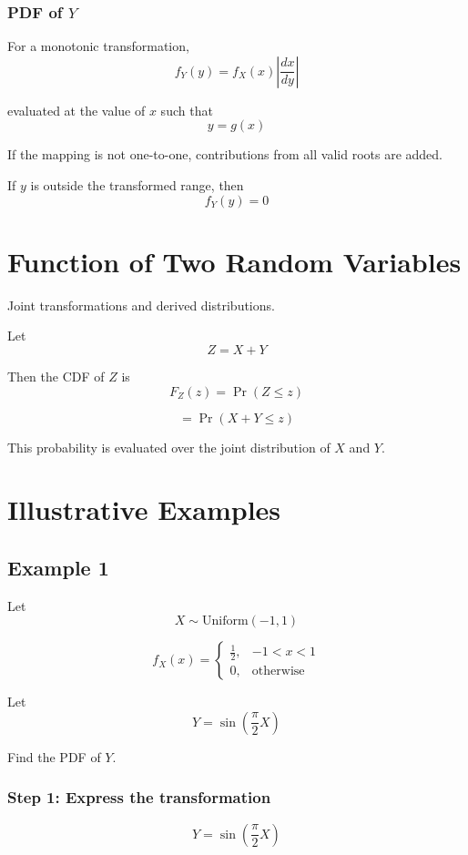 \documentclass[11pt]{article}
\begin{document}
\subsubsection*{PDF of $Y$}

For a monotonic transformation,
\[
f_Y(y) = f_X(x) \left| \frac{dx}{dy} \right|
\]

evaluated at the value of $x$ such that
\[
y = g(x)
\]

If the mapping is not one-to-one, contributions from all valid roots are added.

If $y$ is outside the transformed range, then
\[
f_Y(y) = 0
\]

\section{Function of Two Random Variables}

Joint transformations and derived distributions.

Let
\[
Z = X + Y
\]

Then the CDF of $Z$ is
\[
F_Z(z) = \Pr(Z \le z)
\]

\[
= \Pr(X + Y \le z)
\]

This probability is evaluated over the joint distribution of $X$ and $Y$.

\section{Illustrative Examples}

\subsection{Example 1}

Let
\[
X \sim \text{Uniform}(-1,1)
\]

\[
f_X(x) =
\begin{cases}
\frac{1}{2}, & -1 < x < 1 \\
0, & \text{otherwise}
\end{cases}
\]

Let
\[
Y = \sin\left(\frac{\pi}{2} X\right)
\]

Find the PDF of $Y$.

\subsubsection*{Step 1: Express the transformation}

\[
Y = \sin\left(\frac{\pi}{2} X\right)
\]
\end{document}
